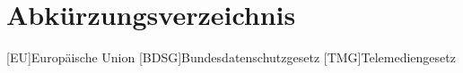\clearpage
\chapter*{Abkürzungsverzeichnis}	


\begin{acronym}[RDBMS]
	[EU]{Europäische Union}
	[BDSG]{Bundesdatenschutzgesetz}
	[TMG]{Telemediengesetz}
\end{acronym}
